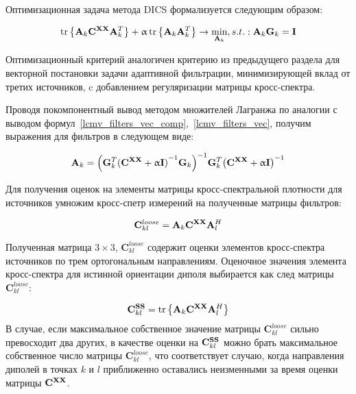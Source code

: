 Оптимизационная задача метода DICS формализуется следующим образом:

\begin{equation}
    \operatorname{tr}\left\{\mathbf{A}_k \mathbf{C}^{\mathbf{X X}} \mathbf{A}_k^T\right\} +
     \upalpha \operatorname{tr}\left\{\mathbf{A}_k \mathbf{A}_k^T\right\}
    \rightarrow \underset{\mathbf{A}_k}{\min}
    , s.t.: \mathbf{A}_k \mathbf{G}_k = \mathbf{I}
\end{equation}

Оптимизационный критерий аналогичен критерию из предыдущего раздела
для векторной постановки задачи адаптивной фильтрации,
минимизирующей вклад от третих источников, c добавлением регуляризации матрицы кросс-спектра.

Проводя покомпонентный вывод методом множителей Лагранжа по аналогии с
выводом формул~\ref{lcmv_filters_vec_comp},~\ref{lcmv_filters_vec}, получим
выражения для фильтров в следующем виде:

\begin{equation}
    \mathbf{A}_k =
    {\left(\mathbf{G}_k^T {(\mathbf{C}^{\mathbf{X X}} + \upalpha \mathbf{I})}^{-1} \mathbf{G}_k\right)}^{-1}
    \mathbf{G}_k^T {\left(\mathbf{C}^{\mathbf{X X}} + \upalpha \mathbf{I}\right)}^{-1}
\end{equation}

Для получения оценок на элементы матрицы кросс-спектральной плотности для источников
умножим кросс-спетр измерений на полученные матрицы фильтров:

\begin{equation}
    \mathbf{C}^{loose}_{kl} = \mathbf{A}_k \mathbf{C}^{\mathbf{X X}} \mathbf{A}_l^H
\end{equation}

Полученная матрица $3\times 3$, $\mathbf{C}^{loose}_{kl}$
содержит оценки элементов кросс-спектра источников по трем ортогональным направлениям.
Оценочное значения элемента кросс-спектра для истинной ориентации диполя
выбирается как след матрицы $\mathbf{C}^{loose}_{kl}$:

\begin{equation}
    \mathbf{C}^{\mathbf{S S}}_{kl} = \operatorname{tr}\left\{\mathbf{A}_k \mathbf{C}^{\mathbf{X X}} \mathbf{A}_l^H\right\}
\end{equation}
В случае, если максимальное собственное значение матрицы $\mathbf{C}^{loose}_{kl}$
сильно превосходит два других, в качестве оценки на $\mathbf{C}^{\mathbf{S S}}_{kl}$ можно брать
максимальное собственное число матрицы $\mathbf{C}^{loose}_{kl}$, что соответствует
случаю, когда направления диполей в точках $k$ и $l$ приближенно оставались неизменными
за время оценки матрицы $\mathbf{C}^{\mathbf{X X}}$.

